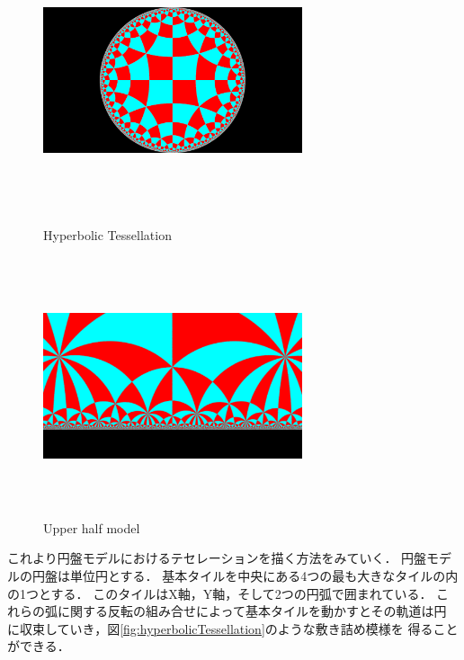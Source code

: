 \begin{figure}[h!tbp]
 \begin{minipage}{0.49\hsize}
  \center
  \includegraphics[width=3in, height=3in,
  keepaspectratio]{../img/tessellation/hyperbolicTessellation.pdf}
  \caption{Hyperbolic Tessellation}
  \label{fig:hyperbolicTessellation}
 \end{minipage}
 \hspace*{\fill}
 \begin{minipage}{0.49\hsize}
  \center
  \includegraphics[width=3in, height=3in, keepaspectratio]{../img/tessellation/upperHalf.pdf}
  \caption{Upper half model}
  \label{fig:upperHalf}
 \end{minipage}
\end{figure}

これより円盤モデルにおけるテセレーションを描く方法をみていく．
円盤モデルの円盤は単位円とする．
基本タイルを中央にある4つの最も大きなタイルの内の1つとする．
このタイルはX軸，Y軸，そして2つの円弧で囲まれている．
これらの弧に関する反転の組み合せによって基本タイルを動かすとその軌道は円
に収束していき，図\ref{fig:hyperbolicTessellation}のような敷き詰め模様を
得ることができる．

